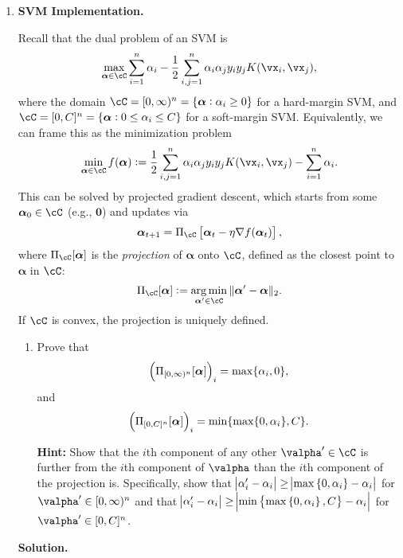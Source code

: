 \documentclass{article}
\def\balpha{\boldsymbol{\alpha}}
\DeclareMathOperator*{\argmin}{arg\,min}
\theoremstyle{definition}
\theoremstyle{remark}
\newenvironment{Q}
{%
\clearpage
\item
}
{%
\phantom{s}%
\bigskip%
\noindent\textbf{Solution.}
}
\begin{document}
\begin{enumerate}[font={\Large\bfseries},left=0pt]
\begin{Q}
    \textbf{\Large SVM Implementation.}
    
    Recall that the dual problem of an SVM is
    \begin{align*}
        \max_{\balpha\in\cC}\sum_{i=1}^{n}\alpha_i-\frac{1}{2}\sum_{i,j=1}^{n}\alpha_i\alpha_jy_iy_jK(\vx_i,\vx_j),
    \end{align*}
    where the domain $\cC=[0,\infty)^n=\{\balpha:\alpha_i\ge0\}$ for a  hard-margin SVM, and $\cC=[0,C]^n=\{\balpha:0\le\alpha_i\le C\}$ for a soft-margin SVM. Equivalently, we can frame this as the minimization problem
    \begin{align*}
        \min_{\balpha\in\cC}f(\balpha):=\frac{1}{2}\sum_{i,j=1}^{n}\alpha_i\alpha_jy_iy_jK(\vx_i,\vx_j)-\sum_{i=1}^{n}\alpha_i.
    \end{align*}
    This can be solved by projected gradient descent, which starts from some $\balpha_0\in\cC$ (e.g., $\boldsymbol{0}$) and updates via
    \begin{align*}
        \balpha_{t+1}=\Pi_{\cC}\sbr{\balpha_t-\eta\nabla f(\balpha_t)},
    \end{align*}
    where $\Pi_{\cC}[\balpha]$ is the \emph{projection} of $\balpha$ onto $\cC$, defined as the closest point to $\balpha$ in $\cC$:
    \begin{align*}
        \Pi_{\cC}[\balpha]:=\argmin_{\balpha'\in\cC}\|\balpha'-\balpha\|_2.
    \end{align*}
    If $\cC$ is convex, the projection is uniquely defined.

    \begin{enumerate}
        \item Prove that
        \begin{align*}
            \del{\Pi_{[0,\infty)^n}[\balpha]}_i=\max\{\alpha_i,0\},
        \end{align*}
        and
        \begin{align*}
            \del{\Pi_{[0,C]^n}[\balpha]}_i=\min\{\max\{0,\alpha_i\},C\}.
        \end{align*}
        
        \textbf{Hint:} Show that the $i$th component of any other $\valpha' \in \cC$ is further from the $i$th component of $\valpha$ than the $i$th component of the projection is. Specifically, show that $\abs{\alpha'_i - \alpha_i} \ge \abs{\max\cbr{0, \alpha_i} - \alpha_i}$ for $\valpha' \in [0,\infty)^n$ and that $\abs{\alpha'_i - \alpha_i} \ge \abs{\min\cbr{\max\cbr{0, \alpha_i}, C} - \alpha_i}$ for $\valpha' \in [0,C]^n$.


\end{enumerate}
\end{Q}
\end{enumerate}
\end{document}
